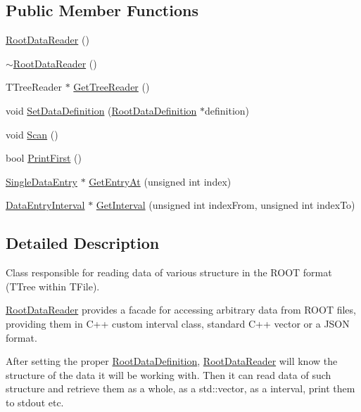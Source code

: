 \subsection*{Public Member Functions}
\begin{DoxyCompactItemize}
\item 
\hyperlink{classRootDataReader_aa06f1264959329cb49e41a7670e6a59f}{Root\+Data\+Reader} ()
\item 
\hyperlink{classRootDataReader_a9f6b5d9e26e27128a445ac3529414f6f}{$\sim$\+Root\+Data\+Reader} ()
\item 
T\+Tree\+Reader $\ast$ \hyperlink{classRootDataReader_a749a090b6c0404f9ff08873a2aef63d7}{Get\+Tree\+Reader} ()
\item 
void \hyperlink{classRootDataReader_ad670745df69f90ea6578d7c29cab716f}{Set\+Data\+Definition} (\hyperlink{classRootDataDefinition}{Root\+Data\+Definition} $\ast$definition)
\item 
void \hyperlink{classRootDataReader_a22eac63f0710d5cce4a1d0a16210ce8f}{Scan} ()
\item 
bool \hyperlink{classRootDataReader_aac09b1313c7ce2c180b5efede781eef6}{Print\+First} ()
\item 
\hyperlink{classSingleDataEntry}{Single\+Data\+Entry} $\ast$ \hyperlink{classRootDataReader_abd5fbaefe8631cf251e9aeade874fa5d}{Get\+Entry\+At} (unsigned int index)
\item 
\hyperlink{classDataEntryInterval}{Data\+Entry\+Interval} $\ast$ \hyperlink{classRootDataReader_a76a02dd2cc6f4cde896ce9180048671b}{Get\+Interval} (unsigned int index\+From, unsigned int index\+To)
\end{DoxyCompactItemize}


\subsection{Detailed Description}
Class responsible for reading data of various structure in the R\+O\+O\+T format (T\+Tree within T\+File). 

\hyperlink{classRootDataReader}{Root\+Data\+Reader} provides a facade for accessing arbitrary data from R\+O\+O\+T files, providing them in C++ custom interval class, standard C++ vector or a J\+S\+O\+N format.

After setting the proper \hyperlink{classRootDataDefinition}{Root\+Data\+Definition}, \hyperlink{classRootDataReader}{Root\+Data\+Reader} will know the structure of the data it will be working with. Then it can read data of such structure and retrieve them as a whole, as a std\+::vector, as a interval, print them to stdout etc. 

